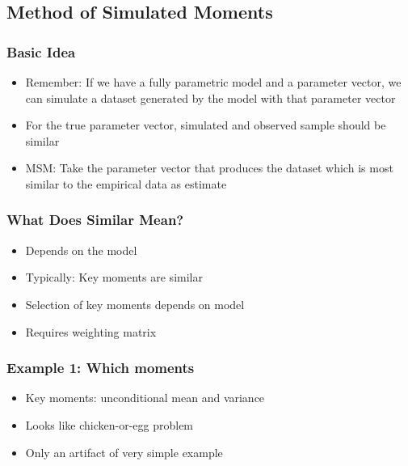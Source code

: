\documentclass[11pt]{beamer}
\begin{document}
\subsection{Method of Simulated Moments}


\begin{frame}[c]\frametitle{Basic Idea}
        \begin{itemize}
            \item Remember: If we have a fully parametric model and a parameter vector, we can simulate a dataset generated by the model with that parameter vector
            \item For the true parameter vector, simulated and observed sample should be similar
            \item MSM: Take the parameter vector that produces the dataset which is most similar to the empirical data as estimate
        \end{itemize}
\end{frame}


\begin{frame}[c]\frametitle{What Does Similar Mean?}
    \begin{itemize}
        \item Depends on the model
        \item Typically: Key moments are similar
        \item Selection of key moments depends on model
        \item Requires weighting matrix
    \end{itemize}
\end{frame}



\begin{frame}[c]\frametitle{Example 1: Which moments}
    \begin{itemize}
        \item Key moments: unconditional mean and variance
        \item Looks like chicken-or-egg problem
        \item Only an artifact of very simple example
    \end{itemize}
\end{frame}
\end{document}
